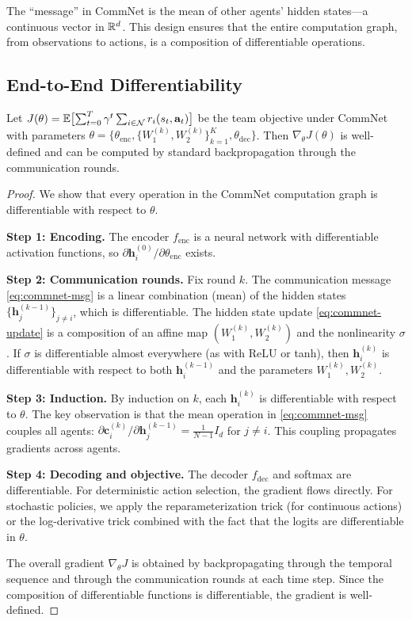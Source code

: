 \documentclass[11pt,a4paper]{article}
\begin{document}
The ``message'' in CommNet is the mean of other agents' hidden
states---a continuous vector in $\mathbb{R}^d$.  This design ensures
that the entire computation graph, from observations to actions,
is a composition of differentiable operations.

\subsection{End-to-End Differentiability}

\begin{theorem}
\label{thm:commnet-gradient}
Let $J(\theta) = \mathbb{E}\bigl[\sum_{t=0}^{T} \gamma^t \sum_{i
\in \mathcal{N}} r_i(s_t, \mathbf{a}_t)\bigr]$ be the team
objective under CommNet with parameters $\theta = \{
\theta_{\mathrm{enc}}, \{W_1^{(k)}, W_2^{(k)}\}_{k=1}^K,
\theta_{\mathrm{dec}}\}$.  Then $\nabla_\theta J(\theta)$ is
well-defined and can be computed by standard backpropagation
through the communication rounds.
\end{theorem}

\begin{proof}
We show that every operation in the CommNet computation graph is
differentiable with respect to $\theta$.

\textbf{Step 1: Encoding.}  The encoder $f_{\mathrm{enc}}$ is a
neural network with differentiable activation functions, so
$\partial \mathbf{h}_i^{(0)} / \partial \theta_{\mathrm{enc}}$
exists.

\textbf{Step 2: Communication rounds.}  Fix round $k$.  The
communication message \eqref{eq:commnet-msg} is a linear
combination (mean) of the hidden states $\{\mathbf{h}_j^{(k-1)}
\}_{j \neq i}$, which is differentiable.  The hidden state
update \eqref{eq:commnet-update} is a composition of an affine
map $(W_1^{(k)}, W_2^{(k)})$ and the nonlinearity $\sigma$.  If
$\sigma$ is differentiable almost everywhere (as with ReLU or
tanh), then $\mathbf{h}_i^{(k)}$ is differentiable with respect
to both $\mathbf{h}_i^{(k-1)}$ and the parameters $W_1^{(k)},
W_2^{(k)}$.

\textbf{Step 3: Induction.}  By induction on $k$, each
$\mathbf{h}_i^{(k)}$ is differentiable with respect to $\theta$.
The key observation is that the mean operation in
\eqref{eq:commnet-msg} couples all agents: $\partial
\mathbf{c}_i^{(k)} / \partial \mathbf{h}_j^{(k-1)} = \frac{1}{N-1}
I_d$ for $j \neq i$.  This coupling propagates gradients across
agents.

\textbf{Step 4: Decoding and objective.}  The decoder
$f_{\mathrm{dec}}$ and softmax are differentiable.  For
deterministic action selection, the gradient flows directly.
For stochastic policies, we apply the reparameterization trick
(for continuous actions) or the log-derivative trick combined
with the fact that the logits are differentiable in $\theta$.

The overall gradient $\nabla_\theta J$ is obtained by
backpropagating through the temporal sequence and through the
communication rounds at each time step.  Since the composition
of differentiable functions is differentiable, the gradient is
well-defined.
\end{proof}
\end{document}
